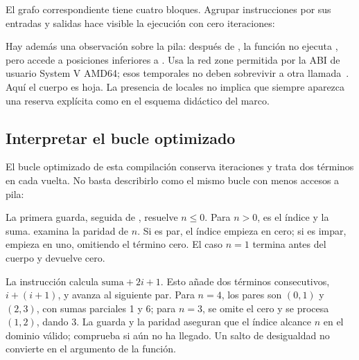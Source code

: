 El grafo correspondiente tiene cuatro bloques. Agrupar instrucciones por sus
entradas y salidas hace visible la ejecución con cero iteraciones:

\begin{center}
\end{center}

Hay además una observación sobre la pila: después de , la
función no ejecuta , pero accede a posiciones inferiores a
. Usa la red zone permitida por la ABI de usuario System V AMD64;
esos temporales no deben sobrevivir a otra llamada~\parencite[\emph{The Stack Frame}]{sysvabi}.
Aquí el cuerpo es hoja. La presencia de locales no implica que siempre aparezca
una reserva explícita como en el esquema didáctico del marco.

\subsection{Interpretar el bucle optimizado}

El bucle optimizado de esta compilación conserva iteraciones y trata dos términos
en cada vuelta. No basta describirlo como el mismo bucle con menos accesos a pila:

\begin{bloquecodigo}

\end{bloquecodigo}

La primera guarda,  seguida de , resuelve
$n\le0$. Para $n>0$,  es el índice y  la suma.
 examina la paridad de $n$. Si es par, el índice empieza
en cero; si es impar, empieza en uno, omitiendo el término cero. El caso $n=1$
termina antes del cuerpo y devuelve cero.

La instrucción  calcula
$\mathrm{suma}+2i+1$. Esto añade dos términos consecutivos,
$i+(i+1)$, y  avanza al siguiente par. Para $n=4$, los
pares son $(0,1)$ y $(2,3)$, con sumas parciales 1 y 6; para $n=3$, se omite
el cero y se procesa $(1,2)$, dando 3. La guarda y la paridad aseguran que el
índice alcance $n$ en el dominio válido;  comprueba si aún no ha
llegado. Un salto de desigualdad no convierte en  el argumento
de la función.

